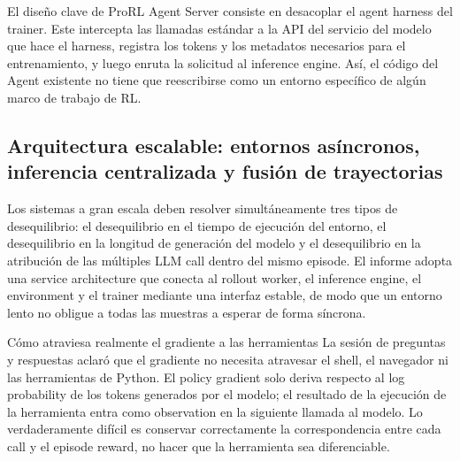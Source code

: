 El diseño clave de ProRL Agent Server consiste en desacoplar el agent harness del trainer. Este intercepta las llamadas estándar a la API del servicio del modelo que hace el harness, registra los tokens y los metadatos necesarios para el entrenamiento, y luego enruta la solicitud al inference engine. Así, el código del Agent existente no tiene que reescribirse como un entorno específico de algún marco de trabajo de RL.


\subsection{Arquitectura escalable: entornos asíncronos, inferencia centralizada y fusión de trayectorias}

Los sistemas a gran escala deben resolver simultáneamente tres tipos de desequilibrio: el desequilibrio en el tiempo de ejecución del entorno, el desequilibrio en la longitud de generación del modelo y el desequilibrio en la atribución de las múltiples LLM call dentro del mismo episode. El informe adopta una service architecture que conecta al rollout worker, el inference engine, el environment y el trainer mediante una interfaz estable, de modo que un entorno lento no obligue a todas las muestras a esperar de forma síncrona.



\begin{importantbox}{Cómo atraviesa realmente el gradiente a las herramientas}
La sesión de preguntas y respuestas aclaró que el gradiente no necesita atravesar el shell, el navegador ni las herramientas de Python. El policy gradient solo deriva respecto al log probability de los tokens generados por el modelo; el resultado de la ejecución de la herramienta entra como observation en la siguiente llamada al modelo. Lo verdaderamente difícil es conservar correctamente la correspondencia entre cada call y el episode reward, no hacer que la herramienta sea diferenciable.
\end{importantbox}


